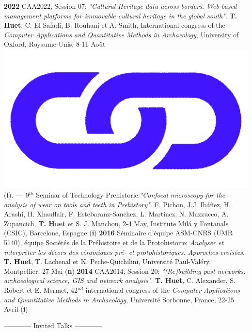 \documentclass{article}
\newcommand{\fr}[1]{}       %
\newcommand{\en}[1]{#1}     %
\begin{document}
\textbf{2022 }CAA2022, Session 07: \textit{"Cultural Heritage data across borders. Web-based management platforms for immovable cultural heritage in the global south"}. \textbf{T. Huet}, C. El Safadi, B. Rouhani et A. Smith, International congress of the \textit{Computer Applications and Quantitative Methods in Archaeology}, University of Oxford, Royaume-Unis, 8-11 Août \href{https://eamena-project.github.io/reveal.js/projects/caa22s07.html}{\includegraphics[scale=0.015]{link_darkblue.png}} (\textbf{i}). 
\smallbreak
\textbf{--- }9${}^{th}$ Seminar of Technology Prehistoric:\textit{"Confocal microscopy for the analysis of wear on tools and teeth in Prehistory"}. F. Pichon, J.J. Ibáñez, H. Arashi, H. Xhauflair, F. Estebaranz-Sanchez, L. Martinez, N. Mazzucco, A. Zupancich, \textbf{T. Huet} et S. J. Manchon, 2-4 May, Institute Milá y Fontanals (CSIC), Barcelone, Espagne (\textbf{i})
\smallbreak
\textbf{2016 }S\'{e}minaire d'\'{e}quipe ASM-CNRS (UMR 5140), \'{e}quipe Soci\'{e}t\'{e}s de la Pr\'{e}histoire et de la Protohistoire: \textit{Analyser et interpr\'{e}ter les d\'{e}cors des c\'{e}ramiques pr\'{e}- et protohistoriques. Approches crois\'{e}es}. \textbf{T. Huet}, T. Lachenal et K. Peche-Quichilini, Universit\'{e} Paul-Val\'{e}ry, Montpellier, 27 Mai (\textbf{n})
\smallbreak
\textbf{2014 }CAA2014, Session 20: \textit{"(Re)building past networks: archaeological science, GIS and network analysis"}. \textbf{T. Huet}, C. Alexander, S. Robert et E. Mermet, 42${}^{nd}$ international congress of the \textit{Computer Applications and Quantitative Methods in Archaeology}, Universit\'{e} Sorbonne, France, 22-25 Avril (\textbf{i})
\bigbreak

\begin{center}
\fr{------------ Communications (invitées) ------------}
\en{------------ Invited Talks ------------}
\end{center}
\smallbreak
	
\end{document}
